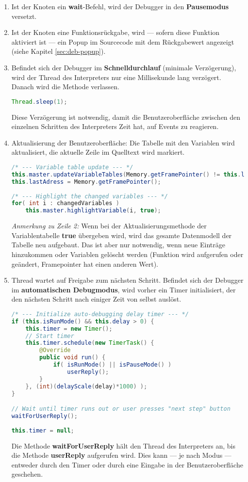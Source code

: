 \begin{enumerate}
\item Ist der Knoten ein \textbf{wait}-Befehl, wird der Debugger in den \textbf{Pausemodus} versetzt.
\item Ist der Knoten eine Funktionsrückgabe, wird --- sofern diese Funktion aktiviert ist --- ein Popup im Sourcecode mit dem Rückgabewert angezeigt (siehe Kapitel \ref{sec:deb-popup}).
\item Befindet sich der Debugger im \textbf{Schnelldurchlauf} (minimale Verzögerung), wird der Thread des Interpreters nur eine Millisekunde lang verzögert. Danach wird die Methode verlassen.
\begin{lstlisting}[language=JAVA]
Thread.sleep(1);
\end{lstlisting}
Diese Verzögerung ist notwendig, damit die Benutzeroberfläche zwischen den einzelnen Schritten des Interpreters Zeit hat, auf Events zu reagieren.

\item Aktualisierung der Benutzeroberfläche: Die Tabelle mit den Variablen wird aktualisiert, die aktuelle Zeile im Quelltext wird markiert.
\begin{lstlisting}[language=JAVA]
/* --- Variable table update --- */
this.master.updateVariableTables(Memory.getFramePointer() != this.lastAdress);
this.lastAdress = Memory.getFramePointer();
		
/* --- Highlight the changed variables --- */
for( int i : changedVariables )
	this.master.highlightVariable(i, true);
\end{lstlisting}
\emph{Anmerkung zu Zeile 2:} Wenn bei der Aktualisierungsmethode der Variablentabelle \textbf{true} übergeben wird, wird das gesamte Datenmodell der Tabelle neu aufgebaut. Das ist aber nur notwendig, wenn neue Einträge hinzukommen oder Variablen gelöscht werden (Funktion wird aufgerufen oder geändert, Framepointer hat einen anderen Wert).

\item Thread wartet auf Freigabe zum nächsten Schritt. Befindet sich der Debugger im \textbf{automatischen Debugmodus}, wird vorher ein Timer initialisiert, der den nächsten Schritt nach einiger Zeit von selbst auslöst.
\begin{lstlisting}[language=JAVA]
/* --- Initialize auto-debugging delay timer --- */
if (this.isRunMode() && this.delay > 0) {
	this.timer = new Timer();
	// Start timer
	this.timer.schedule(new TimerTask() {
		@Override
		public void run() {
			if( isRunMode() || isPauseMode() )
				userReply();
		}
	}, (int)(delayScale(delay)*1000) );
}

// Wait until timer runs out or user presses "next step" button
waitForUserReply();
		
this.timer = null;
\end{lstlisting}
Die Methode \textbf{waitForUserReply} hält den Thread des Interpreters an, bis die Methode \textbf{userReply} aufgerufen wird. Dies kann --- je nach Modus --- entweder durch den Timer oder durch eine Eingabe in der Benutzeroberfläche geschehen.
\end{enumerate}


